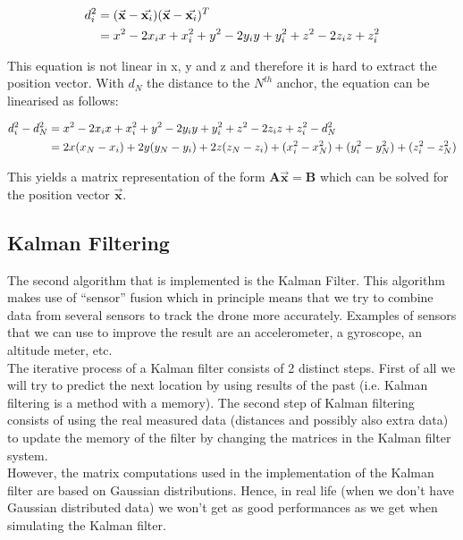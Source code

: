 \documentclass[a4paper]{article}        %
\begin{document}
		\begin{align*}
		\centering
			d_i^2 &= (\vec{\textbf{x}} - \vec{\textbf{x}_i})(\vec{\textbf{x}} - \vec{\textbf{x}_i})^T \\
			&= x^2 - 2x_ix + x_i^2 + y^2 - 2y_iy + y_i^2 + z^2 - 2z_iz + z_i^2
		\end{align*}

		This equation is not linear in x, y and z and therefore it is hard to extract the position vector. With $d_N$ the distance to the $N^{th}$ anchor, the equation can be linearised as follows:

		\begin{align*}
		\centering
			d_i^2 - d_N^2 &= x^2 - 2x_ix + x_i^2 + y^2 - 2y_iy + y_i^2 + z^2 - 2z_iz + z_i^2 - d_N^2 \\
				&= 2x(x_N - x_i) + 2y(y_N - y_i) + 2z(z_N- z_i)+ (x_i^2 - x_N^2) + (y_i^2 - y_N^2)  + (z_i^2 - z_N^2) 
		\end{align*}

		This yields a matrix representation of the form $\textbf{A}\vec{\textbf{x}} = \textbf{B}$ which can be solved for the position vector $\vec{\textbf{x}}$.


	\subsection{Kalman Filtering}
	The second algorithm that is implemented is the Kalman Filter. This algorithm makes use of ``sensor'' fusion which in principle means that we try to combine data from several sensors to track the drone more accurately.
	Examples of sensors that we can use to improve the result are an accelerometer, a gyroscope, an altitude meter, etc.\\
	The iterative process of a Kalman filter consists of 2 distinct steps. First of all we will try to predict the next location by using results of the past (i.e. Kalman filtering is a method with a memory). 
	The second step of Kalman filtering consists of using the real measured data (distances and possibly also extra data) to update the memory of the filter by changing the matrices in the Kalman filter system.\\
	However, the matrix computations used in the implementation of the Kalman filter are based on Gaussian distributions. Hence, in real life (when we don't have Gaussian distributed data) we won't get as good performances as we get when simulating the Kalman filter.
	
\end{document}
